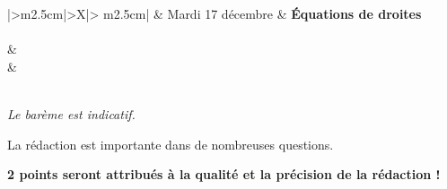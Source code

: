\documentclass[11pt,french]{book}
\begin{document}
\begin{center}
\begin{tabularx}{\textwidth}{|>\centering m{2.5cm}|>\centering X|>{\centering\arraybackslash} m{2.5cm}|}
	\hline
		 &  Mardi 17 décembre  & \textbf{\'Equations de droites} \\
	\hline
		 \\
	\hline
         &  \\
		 &  \\
	\hline
         \\[1cm]
    \hline
\end{tabularx}\bigskip

{\itshape
Le barème est indicatif.\par
La rédaction est importante dans de nombreuses questions.\par
{\bfseries 2 points seront attribués à la qualité et la précision de la rédaction !}
}
\end{center}
\end{document}
